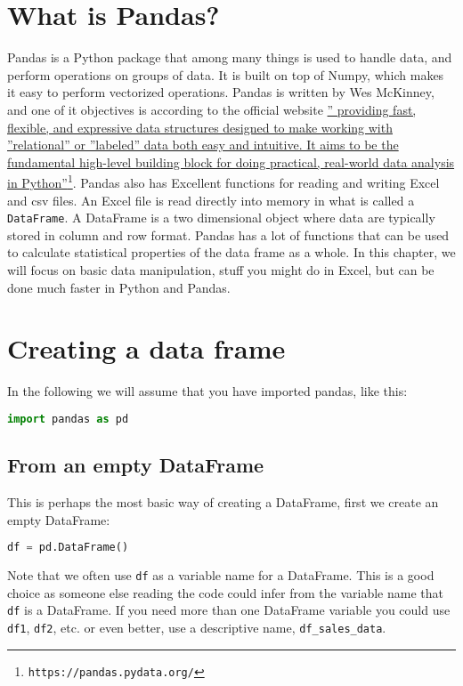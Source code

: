\documentclass[graybox,sectrefs,envcountresetchap,open=right,final]{svmonodo}
\newenvironment{graybox2admon}[1][]{
\begin{graybox2mdframed}[frametitle=#1]
}
{
\end{graybox2mdframed}
}
\begin{document}
\section{What is Pandas?}
Pandas is a Python package that among many things is used to handle data, and perform operations on groups of data. It is built on top of Numpy, which makes it easy to perform vectorized operations. Pandas is written by Wes McKinney, and one of it objectives is according to the official website \href{{https://pandas.pydata.org/}}{'' providing fast, flexible, and expressive data structures designed to make working with ''relational'' or ''labeled'' data both easy and intuitive. It aims to be the fundamental high-level building block for doing practical, real-world data analysis in Python''}\footnote{\texttt{https://pandas.pydata.org/}}. Pandas also has Excellent functions for reading and writing Excel and csv files.  An Excel file is read directly into memory in what is called a \texttt{DataFrame}. A DataFrame is a two dimensional object where data are typically stored in column and row format. Pandas has a lot of functions that can be used to calculate statistical properties of the data frame as a whole. In this chapter, we will focus on basic data manipulation, stuff you might do in Excel, but can be done much faster in Python and Pandas.

\section{Creating a data frame}
In the following we will assume that you have imported pandas, like this:


\begin{lstlisting}[language=python,style=blue1bar]
import pandas as pd

\end{lstlisting}


\subsection{From an empty DataFrame}
This is perhaps the most basic way of creating a DataFrame, first we create an empty DataFrame:


\begin{lstlisting}[language=python,style=blue1bar]
df = pd.DataFrame()

\end{lstlisting}



\begin{graybox2admon}[Variable name]
Note that we often use \texttt{df} as a variable name for a DataFrame. This is a good choice as someone else reading the code could infer from the variable name that \texttt{df} is a DataFrame. If you need more than one DataFrame variable you could use \texttt{df1}, \texttt{df2}, etc. or even better, use a descriptive name, \Verb!df_sales_data!.
\end{graybox2admon}
\end{document}
